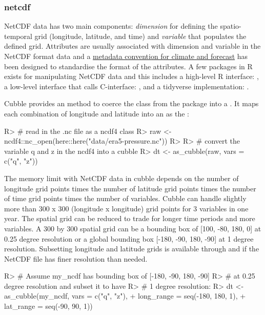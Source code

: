 \documentclass[
]{jss}
\begin{document}
\hypertarget{netcdf}{%
\subsubsection{netcdf}\label{netcdf}}

NetCDF data has two main components: \emph{dimension} for defining the spatio-temporal grid (longitude, latitude, and time) and \emph{variable} that populates the defined grid. Attributes are usually associated with dimension and variable in the NetCDF format data and a \href{http://cfconventions.org/}{metadata convention for climate and forecast} has been designed to standardise the format of the attributes. A few packages in R exists for manipulating NetCDF data and this includes a high-level R interface:  \citep{ncdf4}, a low-level interface that calls C-interface:  \citep{rnetcdf, michna2013rnetcdf}, and a tidyverse implementation:  \citep{tidync}.

Cubble provides an  method to coerce the  class from the  package into a . It maps each combination of longitude and latitude into an  as the :

\begin{CodeChunk}
\begin{CodeInput}
R> # read in the .nc file as a ncdf4 class
R> raw <- ncdf4::nc_open(here::here("data/era5-pressure.nc"))
R> 
R> # convert the variable q and z in the ncdf4 into a cubble
R> dt <- as_cubble(raw, vars = c("q", "z"))
\end{CodeInput}
\end{CodeChunk}

The memory limit with NetCDF data in cubble depends on the number of longitude grid points times the number of latitude grid points times the number of time grid points times the number of variables. Cubble can handle slightly more than 300 x 300 (longitude x longitude) grid points for 3 variables in one year. The spatial grid can be reduced to trade for longer time periods and more variables. A 300 by 300 spatial grid can be a bounding box of {[}100, -80, 180, 0{]} at 0.25 degree resolution or a global bounding box {[}-180, -90, 180, -90{]} at 1 degree resolution. Subsetting longitude and latitude grids is available through  and  if the NetCDF file has finer resolution than needed.

\begin{CodeChunk}
\begin{CodeInput}
R> # Assume my_ncdf has bounding box of [-180, -90, 180, -90]
R> # at 0.25 degree resolution and subset it to have
R> # 1 degree resolution:
R> dt <- as_cubble(my_ncdf, vars = c("q", "z"),
+                 long_range = seq(-180, 180, 1),
+                 lat_range = seq(-90, 90, 1))
\end{CodeInput}
\end{CodeChunk}
\end{document}
